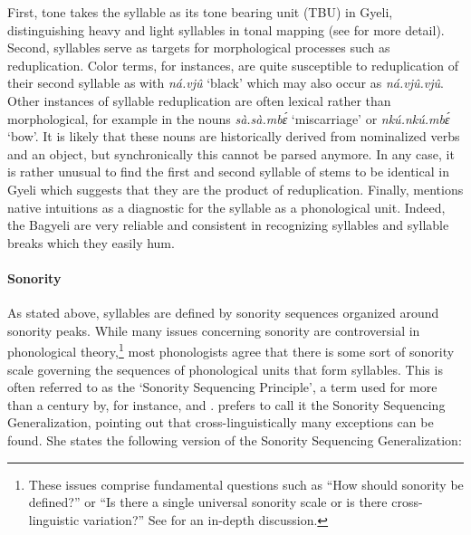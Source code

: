 First, tone takes the syllable as its tone bearing unit (TBU) in Gyeli, distinguishing heavy and light syllables in tonal mapping (see  for more detail). 
Second, syllables serve as targets for morphological processes such as reduplication. Color terms, for instances, are quite susceptible to reduplication of their second syllable as with {\itshape ná.vjû} `black' which may also occur as {\itshape ná.vjû.vjû}. Other instances of syllable reduplication are often lexical rather than morphological, for example in the nouns {\itshape sà.sà.mbɛ́} `miscarriage' or {\itshape nkú.nkú.mbɛ́} `bow'. It is likely that these nouns are historically derived from nominalized verbs and an object, but synchronically this cannot be parsed anymore. In any case, it is rather unusual to find the first and second syllable of stems to be identical in Gyeli which suggests that they are the product of reduplication.
Finally, \citet[209]{blevins95} mentions native intuitions as a diagnostic for the syllable as a phonological unit. Indeed, the Bagyeli are very reliable and consistent in recognizing syllables and syllable breaks which they easily hum.


\paragraph{Sonority} As stated above, syllables are defined by sonority sequences organized around sonority peaks. While many issues concerning sonority are controversial in phonological theory,\footnote {These issues comprise fundamental questions such as ``How should sonority be defined?'' or ``Is there a single universal sonority scale or is there cross-linguistic variation?'' See \citet[287]{clements90} for an in-depth discussion.} most phonologists agree that there is some sort of sonority scale governing the sequences of phonological units that form syllables. This is often referred to as the `Sonority Sequencing Principle', a term used for more than a century by, for instance, \citet{jespersen04} and \citet{selkirk84}. \citet[210-211]{blevins95} prefers to call it the Sonority Sequencing Generalization, pointing out that cross-linguistically many exceptions can be found. She states the following version of the Sonority Sequencing Generalization:

